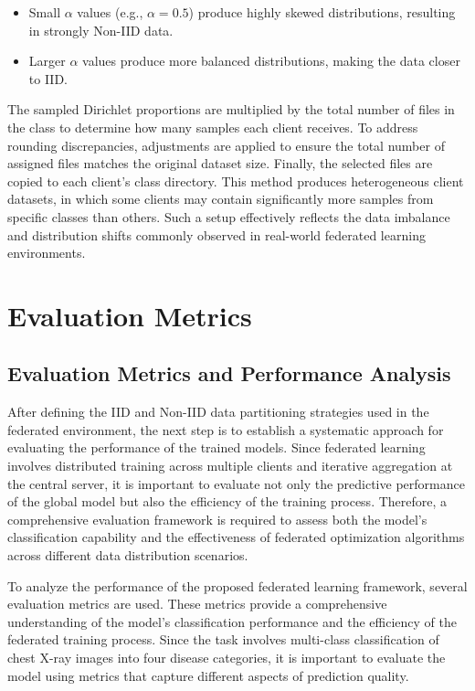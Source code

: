 \documentclass[12pt]{book}
\begin{document}
\begin{itemize}
\item Small $\alpha$ values (e.g., $\alpha = 0.5$) produce highly skewed distributions, resulting in strongly Non-IID data.
\item Larger $\alpha$ values produce more balanced distributions, making the data closer to IID.
\end{itemize}

The sampled Dirichlet proportions are multiplied by the total number of files in the class to determine how many samples each client receives. To address rounding discrepancies, adjustments are applied to ensure the total number of assigned files matches the original dataset size. Finally, the selected files are copied to each client’s class directory. This method produces heterogeneous client datasets, in which some clients may contain significantly more samples from specific classes than others. Such a setup effectively reflects the data imbalance and distribution shifts commonly observed in real-world federated learning environments.

\section{Evaluation Metrics}

\subsection{Evaluation Metrics and Performance Analysis}

After defining the IID and Non-IID data partitioning strategies used in the federated environment, the next step is to establish a systematic approach for evaluating the performance of the trained models. Since federated learning involves distributed training across multiple clients and iterative aggregation at the central server, it is important to evaluate not only the predictive performance of the global model but also the efficiency of the training process. Therefore, a comprehensive evaluation framework is required to assess both the model's classification capability and the effectiveness of federated optimization algorithms across different data distribution scenarios.

To analyze the performance of the proposed federated learning framework, several evaluation metrics are used. These metrics provide a comprehensive understanding of the model's classification performance and the efficiency of the federated training process. Since the task involves multi-class classification of chest X-ray images into four disease categories, it is important to evaluate the model using metrics that capture different aspects of prediction quality.
\end{document}
